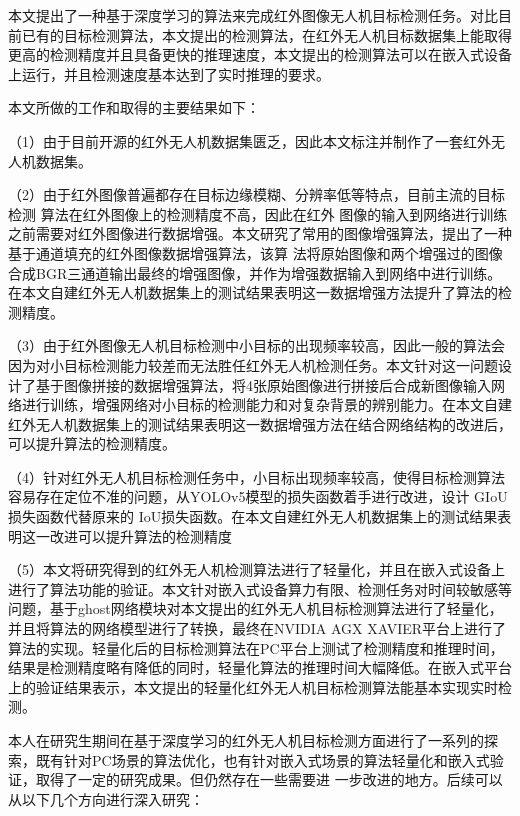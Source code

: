 \begin{conclusions}

本文提出了一种基于深度学习的算法来完成红外图像无人机目标检测任务。对比目前已有的目标检测算法，本文提出的检测算法，在红外无人机目标数据集上能取得更高的检测精度并且具备更快的推理速度，本文提出的检测算法可以在嵌入式设备上运行，并且检测速度基本达到了实时推理的要求。

本文所做的工作和取得的主要结果如下：

（1）由于目前开源的红外无人机数据集匮乏，因此本文标注并制作了一套红外无人机数据集。

（2）由于红外图像普遍都存在目标边缘模糊、分辨率低等特点，目前主流的目标检测
算法在红外图像上的检测精度不高，因此在红外
图像的输入到网络进行训练之前需要对红外图像进行数据增强。本文研究了常用的图像增强算法，提出了一种基于通道填充的红外图像数据增强算法，该算
法将原始图像和两个增强过的图像合成BGR三通道输出最终的增强图像，并作为增强数据输入到网络中进行训练。在本文自建红外无人机数据集上的测试结果表明这一数据增强方法提升了算法的检测精度。

（3）由于红外图像无人机目标检测中小目标的出现频率较高，因此一般的算法会因为对小目标检测能力较差而无法胜任红外无人机检测任务。本文针对这一问题设计了基于图像拼接的数据增强算法，将4张原始图像进行拼接后合成新图像输入网络进行训练，增强网络对小目标的检测能力和对复杂背景的辨别能力。在本文自建红外无人机数据集上的测试结果表明这一数据增强方法在结合网络结构的改进后，可以提升算法的检测精度。

（4）针对红外无人机目标检测任务中，小目标出现频率较高，使得目标检测算法容易存在定位不准的问题，从YOLOv5模型的损失函数着手进行改进，设计 GIoU 损失函数代替原来的
IoU损失函数。在本文自建红外无人机数据集上的测试结果表明这一改进可以提升算法的检测精度


（5）本文将研究得到的红外无人机检测算法进行了轻量化，并且在嵌入式设备上进行了算法功能的验证。本文针对嵌入式设备算力有限、检测任务对时间较敏感等问题，基于ghost网络模块对本文提出的红外无人机目标检测算法进行了轻量化，并且将算法的网络模型进行了转换，最终在NVIDIA AGX XAVIER平台上进行了算法的实现。轻量化后的目标检测算法在PC平台上测试了检测精度和推理时间，结果是检测精度略有降低的同时，轻量化算法的推理时间大幅降低。在嵌入式平台上的验证结果表示，本文提出的轻量化红外无人机目标检测算法能基本实现实时检测。

本人在研究生期间在基于深度学习的红外无人机目标检测方面进行了一系列的探
索，既有针对PC场景的算法优化，也有针对嵌入式场景的算法轻量化和嵌入式验证，取得了一定的研究成果。但仍然存在一些需要进
一步改进的地方。后续可以从以下几个方向进行深入研究：


\end{conclusions}
